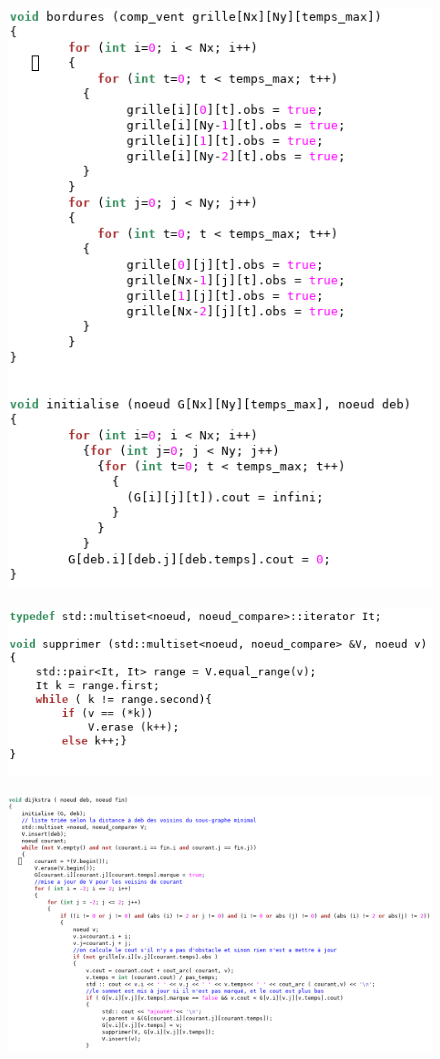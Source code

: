 \documentclass{beamer}
\begin{document}
\begin{frame}[plain]
\begin{figure}
\includegraphics[scale=0.35]{dij3.png} 
\end{figure}
\end{frame}

\begin{frame}[plain]
\begin{figure}
\includegraphics[scale=0.35]{dij4.png} 
\end{figure}
\end{frame}

\begin{frame}[plain]
\begin{figure}
\includegraphics[scale=0.35]{dij5.png} 
\end{figure}
\end{frame}
\end{document}
